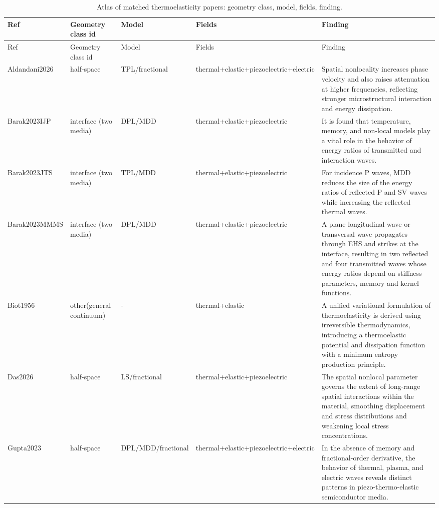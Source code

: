 \begin{longtable}{p{2.2cm}p{2.0cm}p{2.6cm}p{3.2cm}p{3.0cm}}
\caption{Atlas of matched thermoelasticity papers: geometry class, model, fields, finding.}\\
\toprule
Ref & Geometry class id & Model & Fields & Finding \\
\midrule
\endfirsthead
\toprule
Ref & Geometry class id & Model & Fields & Finding \\
\midrule
\endhead
\bottomrule
\endfoot
Aldandani2026 & half-space & TPL/fractional & thermal+elastic+piezoelectric+electric & Spatial nonlocality increases phase velocity and also raises attenuation at higher frequencies, reflecting stronger microstructural interaction and energy dissipation. \\
Barak2023IJP & interface (two media) & DPL/MDD & thermal+elastic+piezoelectric & It is found that temperature, memory, and non-local models play a vital role in the behavior of energy ratios of transmitted and interaction waves. \\
Barak2023JTS & interface (two media) & TPL/MDD & thermal+elastic+piezoelectric & For incidence P waves, MDD reduces the size of the energy ratios of reflected P and SV waves while increasing the reflected thermal waves. \\
Barak2023MMMS & interface (two media) & DPL/MDD & thermal+elastic+piezoelectric & A plane longitudinal wave or transversal wave propagates through EHS and strikes at the interface, resulting in two reflected and four transmitted waves whose energy ratios depend on stiffness parameters, memory and kernel functions. \\
Biot1956 & other(general continuum) & - & thermal+elastic & A unified variational formulation of thermoelasticity is derived using irreversible thermodynamics, introducing a thermoelastic potential and dissipation function with a minimum entropy production principle. \\
Das2026 & half-space & LS/fractional & thermal+elastic+piezoelectric & The spatial nonlocal parameter governs the extent of long-range spatial interactions within the material, smoothing displacement and stress distributions and weakening local stress concentrations. \\
Gupta2023 & half-space & DPL/MDD/fractional & thermal+elastic+piezoelectric+electric & In the absence of memory and fractional-order derivative, the behavior of thermal, plasma, and electric waves reveals distinct patterns in piezo-thermo-elastic semiconductor media. \\

\end{longtable}
